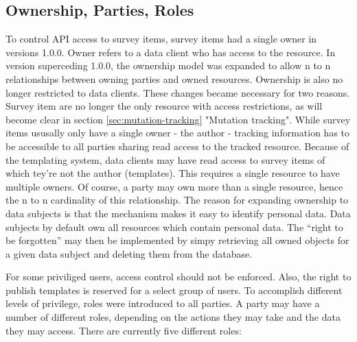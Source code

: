 \documentclass[a4paper,11pt]{article}
\begin{document}
            \subsection{Ownership, Parties, Roles}
                To control API access to survey items, survey items had a single
                owner in versions 1.0.0. Owner refers to a data client who has access
                to the resource. In version superceding 1.0.0, the ownership model
                was expanded to allow n to n relationships between owning parties
                and owned resources. Ownership is also no longer restricted to
                data clients. These changes became necessary for two reasons.
                Survey item are no longer the only resource with access restrictions,
                as will become clear in section \ref{sec:mutation-tracking} "Mutation tracking".
                While survey items ususally only have a single owner - the author - 
                tracking information has to be accessible to all parties sharing
                read access to the tracked resource. Because of the templating system,
                data clients may have read access to survey items of which tey're not
                the author (templates). This requires a single resource to have multiple owners.
                Of course, a party may own more than a single resource, hence the n to n
                cardinality of this relationship. The reason for expanding ownership
                to data subjects is that the mechanism makes it easy to identify personal
                data. Data subjects by default own all resources which contain
                personal data. The ``right to be forgotten'' may then be implemented by
                simpy retrieving all owned objects for a given data subject and deleting 
                them from the database.

                For some priviliged users, access control should not be enforced.
                Also, the right to publish templates is reserved for a select
                group of users. To accomplish different levels of privilege,
                roles were introduced to all parties. A party may have a number
                of different roles, depending on the actions they may take and
                the data they may access. There are currently five different roles:
\end{document}
